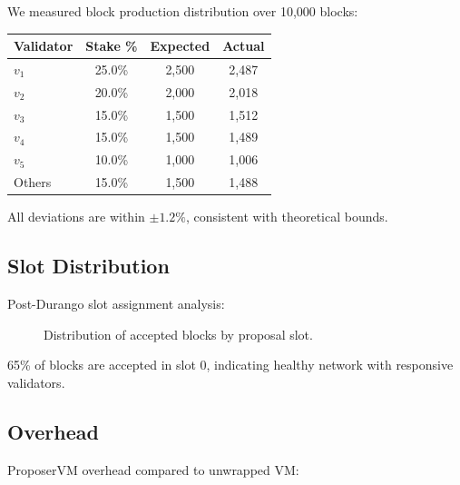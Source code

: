 \documentclass[11pt,letterpaper]{article}
\begin{document}
We measured block production distribution over 10,000 blocks:

\begin{center}
\begin{tabular}{lccc}
\toprule
\textbf{Validator} & \textbf{Stake \%} & \textbf{Expected} & \textbf{Actual} \\
\midrule
$v_1$ & 25.0\% & 2,500 & 2,487 \\
$v_2$ & 20.0\% & 2,000 & 2,018 \\
$v_3$ & 15.0\% & 1,500 & 1,512 \\
$v_4$ & 15.0\% & 1,500 & 1,489 \\
$v_5$ & 10.0\% & 1,000 & 1,006 \\
Others & 15.0\% & 1,500 & 1,488 \\
\bottomrule
\end{tabular}
\end{center}

All deviations are within $\pm 1.2\%$, consistent with theoretical bounds.

\subsection{Slot Distribution}

Post-Durango slot assignment analysis:

\begin{figure}[h]
\centering
{}
\caption{Distribution of accepted blocks by proposal slot.}
\label{fig:slots}
\end{figure}

65\% of blocks are accepted in slot 0, indicating healthy network with responsive validators.

\subsection{Overhead}

ProposerVM overhead compared to unwrapped VM:
\end{document}
